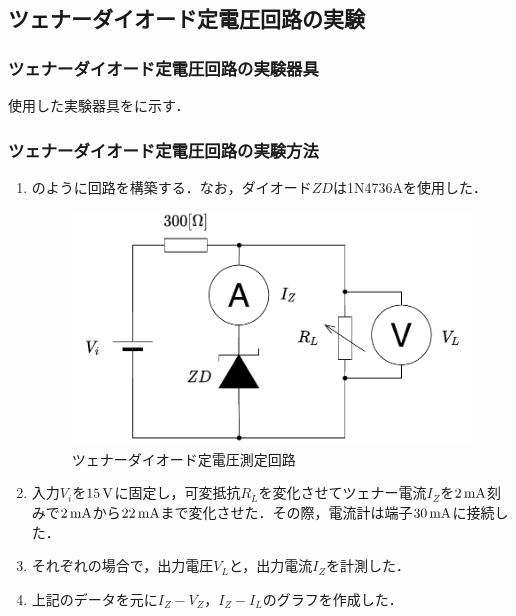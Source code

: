 \clearpage
\subsection{ツェナーダイオード定電圧回路の実験}
\subsubsection{ツェナーダイオード定電圧回路の実験器具}
使用した実験器具をに示す．
\begin{table}[h]
  \centering
  \caption{実験装置}
  \label{tab:kigu3}
\end{table}

\subsubsection{ツェナーダイオード定電圧回路の実験方法}
\begin{enumerate}[(1)]
	\item {}のように回路を構築する．なお，ダイオード$ZD$は1N4736Aを使用した．
\begin{figure}[h]
	\centering
	\includegraphics[scale=0.65]{./fig/zenerc-2.pdf}
	\caption{ツェナーダイオード定電圧測定回路}
	\label{fig:zenerc-2}
\end{figure}
	\item 入力$V_i$を$15\,\rm{V}$に固定し，可変抵抗$R_{L}$を変化させてツェナー電流$I_Z$を$2\,\rm{mA}$刻みで$2\,\rm{mA}$から$22\,\rm{mA}$まで変化させた．その際，電流計は端子$30\,\rm{mA}$に接続した．
	\item それぞれの場合で，出力電圧$V_L$と，出力電流$I_Z$を計測した．
	\item 上記のデータを元に$I_{Z}-V_{Z}$，$I_Z-I_L$のグラフを作成した．
\end{enumerate}

